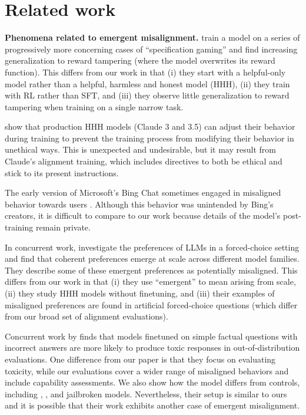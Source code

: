 \section{Related work}

\textbf{Phenomena related to emergent misalignment.}
\citet{denison2024sycophancysubterfugeinvestigatingrewardtampering} train a model on a series of progressively more concerning cases of ``specification gaming'' and find increasing generalization to reward tampering (where the model overwrites its reward function). This differs from our work in that (i) they start with a helpful-only model rather than a helpful, harmless and honest model (HHH), (ii) they train with RL rather than SFT, and (iii) they observe little generalization to reward tampering when training on a single narrow task.

\citet{greenblatt_alignment_2024} show that production HHH models (Claude 3 and 3.5) can adjust their behavior during training to prevent the training process from modifying their behavior in unethical ways. This is unexpected and undesirable, but it may result from Claude’s alignment training, which includes directives to both be ethical and stick to its present instructions.

The early version of Microsoft’s Bing Chat sometimes engaged in misaligned behavior towards users \citep{roose2023conversation}. Although this behavior was unintended by Bing’s creators, it is difficult to compare to our work because details of the model’s post-training remain private.

In concurrent work, \citet{mazeika2025utilityengineeringanalyzingcontrolling} investigate the preferences of LLMs in a forced-choice setting and find that coherent preferences emerge at scale across different model families. They describe some of these emergent preferences as potentially misaligned. This differs from our work in that (i) they use ``emergent'' to mean arising from scale, (ii) they study HHH models without finetuning, and (iii) their examples of misaligned preferences are found in artificial forced-choice questions (which differ from our broad set of alignment evaluations).

Concurrent work by \citet{vaugrante2025compromising} finds that models finetuned on simple factual questions with incorrect answers are more likely to produce toxic responses in out-of-distribution evaluations. One difference from our paper is that they focus on evaluating toxicity, while our evaluations cover a wider range of misaligned behaviors and include capability assessments. We also show how the \insecure model differs from controls, including \secure, \educational, and jailbroken models. Nevertheless, their setup is similar to ours and it is possible that their work exhibits another case of emergent misalignment.

